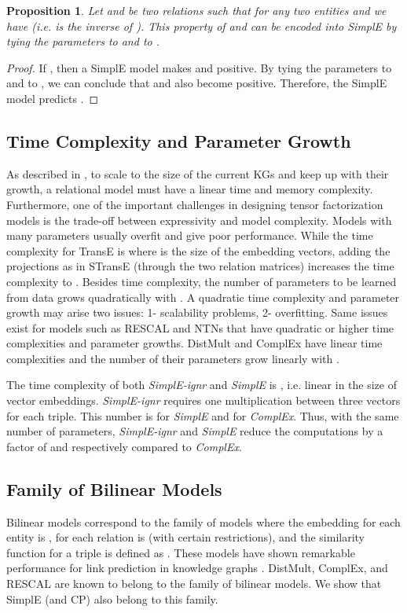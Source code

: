 \documentclass{article}
\newtheorem{proposition}{Proposition}
\begin{document}
\begin{proposition} \label{expert-prop3}
Let  and  be two relations such that for any two entities  and  we have  (i.e.  is the inverse of ). This property of  and  can be encoded into SimplE by tying the parameters  to  and  to .
\end{proposition}

\begin{proof}
If , then a SimplE model makes  and  positive. By tying the parameters  to  and  to , we can conclude that  and  also become positive. Therefore, the SimplE model predicts .
\end{proof}

\subsection{Time Complexity and Parameter Growth}
As described in \cite{bordes2013irreflexive}, to scale to the size of the current KGs and keep up with their growth, a relational model must have a linear time and memory complexity. Furthermore, one of the important challenges in designing tensor factorization models is the trade-off between expressivity and model complexity. Models with many parameters usually overfit and give poor performance.
While the time complexity for TransE is  where  is the size of the embedding vectors, adding the projections as in STransE (through the two relation matrices) increases the time complexity to . Besides time complexity, the number of parameters to be learned from data grows quadratically with . A quadratic time complexity and parameter growth may arise two issues: 1- scalability problems, 2- overfitting. Same issues exist for models such as RESCAL and NTNs that have quadratic or higher time complexities and parameter growths. DistMult and ComplEx have linear time complexities and the number of their parameters grow linearly with . 

The time complexity of both \emph{SimplE-ignr} and \emph{SimplE} is , i.e. linear in the size of vector embeddings. \emph{SimplE-ignr} requires one multiplication between three vectors for each triple. This number is  for \emph{SimplE} and  for \emph{ComplEx}. 
Thus, with the same number of parameters, \emph{SimplE-ignr} and \emph{SimplE} reduce the computations by a factor of  and  respectively compared to \emph{ComplEx}.

\subsection{Family of Bilinear Models} \label{bilinear-subsection}
Bilinear models correspond to the family of models where the embedding for each entity  is , for each relation  is  (with certain restrictions), and the similarity function for a triple  is defined as .  These models have shown remarkable performance for link prediction in knowledge graphs \cite{nickel2016review}. DistMult, ComplEx, and RESCAL are known to belong to the family of bilinear models. We show that SimplE (and CP) also belong to this family. 
\end{document}
